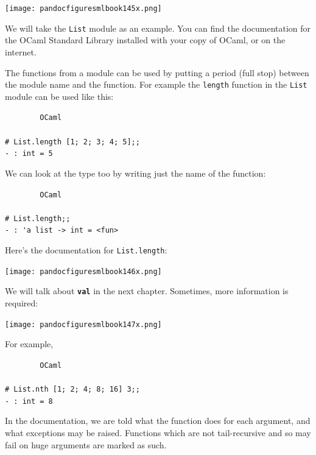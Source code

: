 \documentclass[]{book}
\newcommand{\smspace}{\vspace{4mm}}
\begin{document}
\medskip
\begin{center}
\noindent\texttt{[image: pandocfiguresmlbook145x.png]}
\end{center}
\medskip

\noindent We will take the \texttt{List} module as an example. You can find the documentation for the OCaml Standard Library installed with your copy of OCaml, or on the internet.

The functions from a module can be used by putting a period (full stop) between the module name and the function. For example the \texttt{length} function in the \texttt{List} module can be used like this:

\smspace
\noindent\verb!        OCaml!\\
\noindent\\
\noindent\texttt{\# List.length [1; 2; 3; 4; 5];;}\\
\noindent\verb!- : int = 5!
\smspace

\noindent We can look at the type too by writing just the name of the function:

\smspace
\noindent\verb!        OCaml!\\
\noindent\\
\noindent\texttt{\# List.length;;}\\
\noindent\verb!- : 'a list -> int = <fun>!
\smspace

\noindent Here's the documentation for \texttt{List.length}:

\medskip
\begin{center}
\noindent\texttt{[image: pandocfiguresmlbook146x.png]}
\end{center}
\medskip

\noindent We will talk about \textbf{\texttt{val}} in the next chapter. Sometimes, more information is required:

\medskip
\begin{center}
\noindent\texttt{[image: pandocfiguresmlbook147x.png]}
\end{center}
\medskip

\noindent For example,

\smspace
\noindent\verb!        OCaml!\\
\noindent\\
\noindent\texttt{\# List.nth [1; 2; 4; 8; 16] 3;;}\\
\noindent\verb!- : int = 8!
\smspace

\noindent In the documentation, we are told what the function does for each argument, and what exceptions may be raised. Functions which are not tail-recursive and so may fail on huge arguments are marked as such.
\end{document}
